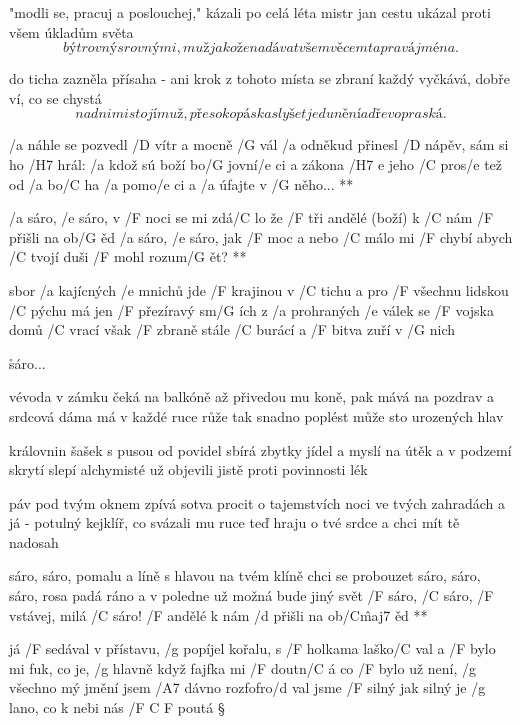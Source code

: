 "modli se, pracuj a poslouchej," kázali po celá léta
mistr jan cestu ukázal proti všem úkladům světa
\[ být rovný s rovnými, muž jako žena
dávat všem věcem ta pravá jména. \] \s

do ticha zazněla přísaha - ani krok z tohoto místa
se zbraní každý vyčkává, dobře ví, co se chystá
\[ nad nimi stojí muž, přes oko páska
slyšet je dunění a dřevo praská. \]

\R  /a náhle se pozvedl /D vítr a mocně /G vál
    /a odněkud přinesl /D nápěv, sám si ho /H7 hrál:
    /a kdož sú boží bo/G jovní/e ci a zákona /{H7 e} jeho
    /C pros/e tež od /a bo/C ha /a pomo/e ci a /a úfajte v /G něho... **




\R /a sáro, /e sáro, v /F noci se mi zdá/C lo
   že /F tři andělé (boží) k /C nám /F přišli na ob/G ěd
   /a sáro, /e sáro, jak /F moc a nebo /C málo
   mi /F chybí abych /C tvojí duši /F mohl rozum/G ět? **

sbor /a kajícných /e mnichů jde /F krajinou v /C tichu
a pro /F všechnu lidskou /C pýchu má jen /F přezíravý sm/G ích
z /a prohraných /e válek se /F vojska domů /C vrací
však /F zbraně stále /C burácí a /F bitva zuří v /G nich

\r sáro...

vévoda v zámku čeká na balkóně
až přivedou mu koně, pak mává na pozdrav
a srdcová dáma má v každé ruce růže
tak snadno poplést může sto urozených hlav

\rr

královnin šašek s pusou od povidel
sbírá zbytky jídel a myslí na útěk
a v podzemí skrytí slepí alchymisté
už objevili jistě proti povinnosti lék

\rr

páv pod tvým oknem zpívá sotva procit
o tajemstvích noci ve tvých zahradách
a já - potulný kejklíř, co svázali mu ruce
teď hraju o tvé srdce a chci mít tě nadosah

\R  sáro, sáro, pomalu a líně
    s hlavou na tvém klíně chci se probouzet
    sáro, sáro, sáro, rosa padá ráno
    a v poledne už možná bude jiný svět
    /F sáro, /C sáro, /F vstávej, milá /C sáro!
    /F andělé k nám /d přišli na ob/C\^{maj7} ěd **





já /F sedával v přístavu, /g popíjel kořalu, s /F holkama laško/C val
a /F bylo mi fuk, co je, /g hlavně když fajfka mi /F doutn/C á
co /F bylo už není, /g všechno mý jmění jsem /A7 dávno rozfofro/d val
jsme /F silný jak silný je /g lano, co k nebi nás /{F C F} poutá \S

